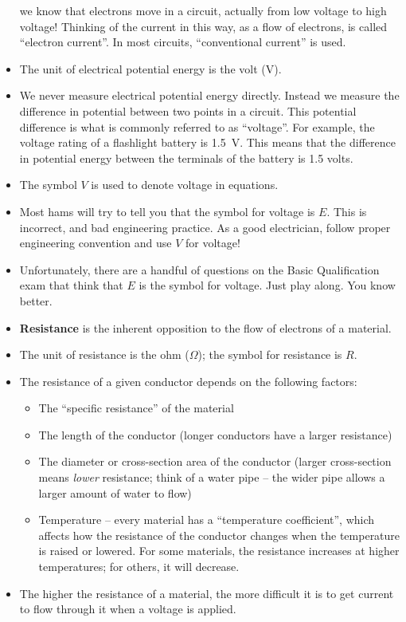 \documentclass[letterpaper,12pt]{scrartcl}
\begin{document}
\begin{itemize}
we know that electrons move in a circuit, actually from low voltage to high voltage! Thinking of the current in this way,
as a flow of electrons, is called ``electron current''. In most circuits, ``conventional current'' is used.
\item The unit of electrical potential energy is the volt (V).
\item We never measure electrical potential energy directly. Instead we measure the difference in potential between two points in a circuit.
This potential difference is what is commonly referred to as ``voltage''. For example, the voltage rating of a flashlight battery is 1.5~V.
This means that the difference in potential energy between the terminals of the battery is 1.5 volts.
\item The symbol $V$ is used to denote voltage in equations.
\item Most hams will try to tell you that the symbol for voltage is $E$. This is incorrect, and bad engineering practice.
As a good electrician, follow proper engineering convention and use $V$ for voltage!
\item Unfortunately, there are a handful of questions on the Basic Qualification exam that think that $E$ is the symbol for voltage.
Just play along. You know better.
\item \textbf{Resistance} is the inherent opposition to the flow of electrons of a material.
\item The unit of resistance is the ohm ($\Omega$); the symbol for resistance is $R$.
\item The resistance of a given conductor depends on the following factors:
\begin{itemize}
\item The ``specific resistance'' of the material
\item The length of the conductor (longer conductors have a larger resistance)
\item The diameter or cross-section area of the conductor (larger cross-section means \textit{lower} resistance;
think of a water pipe -- the wider pipe allows a larger amount of water to flow)
\item Temperature -- every material has a ``temperature coefficient'', which affects how the resistance of the conductor changes when
the temperature is raised or lowered. For some materials, the resistance increases at higher temperatures; for others, it will decrease.
\end{itemize}
\item The higher the resistance of a material, the more difficult it is to get current to flow through it when a voltage is applied.

\end{itemize}
\end{document}
